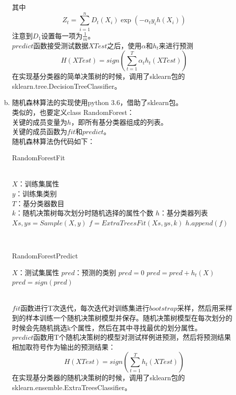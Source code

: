 \documentclass[a4paper,UTF8]{article}
\numberwithin{equation}{section}
\begin{document}
\begin{enumerate}[1.]
\begin{enumerate}[a.]
其中
\begin{equation}
Z_t = \sum_{i=1}^{n}D_t(X_i)\exp(-\alpha_ty_ih(X_i))
\end{equation}
注意到$D_1$设置每一项为$\frac{1}{m}$。\\
$predict$函数接受测试数据$XTest$之后，使用$\alpha$和$h_t$来进行预测
\begin{equation}
H(XTest) = sign(\sum_{t=1}^{T}\alpha_th_t(XTest))
\end{equation}
在实现基分类器的简单决策树的时候，调用了sklearn包的sklearn.tree.DecisionTreeClassifier。\\
\item 随机森林算法的实现使用python 3.6，借助了sklearn包。\\
类似的，也要定义class RandomForest：\\
关键的成员变量为$h$，即所有基分类器组成的列表。\\
关键的成员函数为$fit$和$predict$。\\
随机森林算法伪代码如下：
\begin{algorithm}[h]  
	\caption{RandomForestFit}  
	\begin{algorithmic}[1]  
		\Require\\  
		$X$：训练集属性\\
		$y$：训练集类别\\
		$T$：基分类器数目\\
		$k$：随机决策树每次划分时随机选择的属性个数
		\Ensure  
		$h$：基分类器列表 
		\State $Xs, ys = Sample(X, y)$
		\State $f = ExtraTreesFit(Xs, ys, k)$
		\State $h.append(f)$
		\EndFor
		\label{code:End1}  
	\end{algorithmic}  
\end{algorithm}\\
\begin{algorithm}[h]  
	\caption{RandomForestPredict}  
	\begin{algorithmic}[1]  
		\Require
		$X$：测试集属性
		\Ensure  
		$pred$：预测的类别
		\State $pred = 0$ 
		\State $pred = pred + h_t(X)$
		\EndFor
		\State $pred = sign(pred)$
		\label{code:End2}  
	\end{algorithmic}  
\end{algorithm}\\
$fit$函数进行T次迭代，每次迭代对训练集进行$bootstrap$采样，然后用采样到的样本训练一个随机决策树模型并保存。随机决策树模型在每次划分的时候会先随机挑选k个属性，然后在其中寻找最优的划分属性。\\
$predict$函数用T个随机决策树的模型对测试样例进预测，然后将预测结果相加取符号作为输出的预测结果：
\begin{equation}
H(XTest) = sign(\sum_{t=1}^{T}h_t(XTest))
\end{equation}
在实现基分类器的随机决策树的时候，调用了sklearn包的sklearn.ensemble.ExtraTreesClassifier。\\
\end{enumerate}
\end{enumerate}
	
\end{document}
